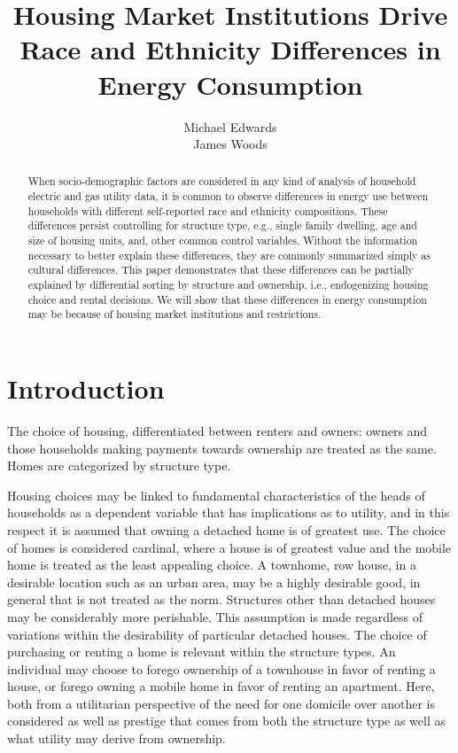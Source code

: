 \documentclass{article}
\author{Michael Edwards\\ 
  James Woods}
\title{Housing Market Institutions Drive Race and Ethnicity Differences in Energy Consumption}
\begin{document}
\maketitle


\begin{abstract}

When socio-demographic factors are considered in any kind of analysis of household electric and gas utility data, it is common to observe differences in energy use between households with different self-reported race and ethnicity compositions. These differences persist controlling for structure type, e.g., single family dwelling, age and size of housing units, and, other common control variables. Without the information necessary to better explain these differences, they are commonly summarized simply as cultural differences. This paper demonstrates that these differences can be partially explained by differential sorting by structure and ownership, i.e., endogenizing housing choice and rental decisions. We will show that these differences in energy consumption may be because of housing market institutions and restrictions.
\end{abstract}

\section{Introduction}

The choice of housing, differentiated between renters and owners: owners and those households making payments towards ownership are treated as the same.  Homes are categorized by structure type.   

Housing choices may be linked to fundamental characteristics of the heads of households as a dependent variable that has implications as to utility, and in this respect it is assumed that owning a detached home is of greatest use.  The choice of homes is considered cardinal, where a house is of greatest value and the mobile home is treated as the least appealing choice.  A townhome, row house, in a desirable location such as an urban area, may be a highly desirable good, in general that is not treated as the norm. Structures other than detached houses may be considerably more perishable.  This assumption is made regardless of variations within the desirability of particular detached houses. The choice of purchasing or renting a home is relevant within the structure types.  An individual may choose to forego ownership of a townhouse in favor of renting a house, or forego owning a mobile home in favor of renting an apartment.  Here, both from a utilitarian perspective of the need for one domicile over another is considered as well as prestige that comes from both the structure type as well as what utility may derive from ownership.
\end{document}
